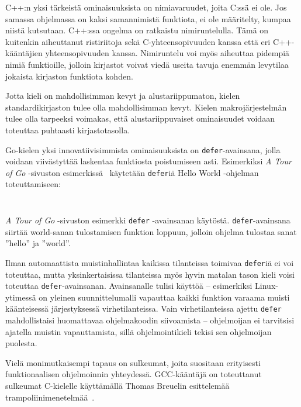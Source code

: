C++:n yksi tärkeistä ominaisuuksista on nimiavaruudet, joita C:ssä ei ole. Jos
samassa ohjelmassa on kaksi samannimistä funktiota, ei ole määritelty, kumpaa
niistä kutsutaan. C++:ssa ongelma on ratkaistu nimiruntelulla. Tämä on
kuitenkin aiheuttanut ristiriitoja sekä C-yhteensopivuuden kanssa että eri
C++-kääntäjien yhteensopivuuden kanssa. Nimiruntelu voi myös aiheuttaa pidempiä
nimiä funktioille, jolloin kirjastot voivat viedä useita tavuja enemmän
levytilaa jokaista kirjaston funktiota kohden.

Jotta kieli on mahdollisimman kevyt ja alustariippumaton, kielen
standardikirjaston tulee olla mahdollisimman kevyt. Kielen makrojärjestelmän
tulee olla tarpeeksi voimakas, että alustariippuvaiset ominaisuudet voidaan
toteuttaa puhtaasti kirjastotasolla.

Go-kielen yksi innovatiivisimmista ominaisuuksista on \texttt{defer}-avainsana,
jolla voidaan viivästyttää laskentaa funktiosta poistumiseen asti. Esimerkiksi
\emph{A Tour of Go} -sivuston esimerkissä~\citep{gotourdefer} käytetään
\texttt{defer}iä Hello World -ohjelman toteuttamiseen:

\begin{listing}[ht!]
    \inputminted{Go}{defer.go}
    \inputminted{text}{defer-output.txt}
    \caption{\emph{A Tour of Go} -sivuston esimerkki \texttt{defer} -avainsanan
    käytöstä. \texttt{defer}-avainsana siirtää world-sanan tulostamisen
    funktion loppuun, jolloin ohjelma tulostaa sanat ''hello'' ja ''world''.}
\end{listing}

\FloatBarrier

Ilman automaattista muistinhallintaa kaikissa tilanteissa toimivaa
\texttt{defer}iä ei voi toteuttaa, mutta yksinkertaisissa tilanteissa myös
hyvin matalan tason kieli voisi toteuttaa \texttt{defer}-avainsanan.
Avainsanalle tulisi käyttöä -- esimerkiksi Linux-ytimessä on yleinen
suunnittelumalli vapauttaa kaikki funktion varaama muisti käänteisessä
järjestyksessä virhetilanteissa. Vain virhetilanteissa ajettu \texttt{defer}
mahdollistaisi huomattavaa ohjelmakoodin siivoamista -- ohjelmoijan ei
tarvitsisi ajatella muistin vapauttamista, sillä ohjelmointikieli tekisi sen
ohjelmoijan puolesta.

Vielä monimutkaisempi tapaus on sulkeumat, joita suositaan erityisesti
funktionaalisen ohjelmoinnin yhteydessä. GCC-kääntäjä on toteuttanut sulkeumat
C-kielelle käyttämällä Thomas Breuelin esittelemää
trampoliinimenetelmää~\citep{gccnested, cppclosure}.

